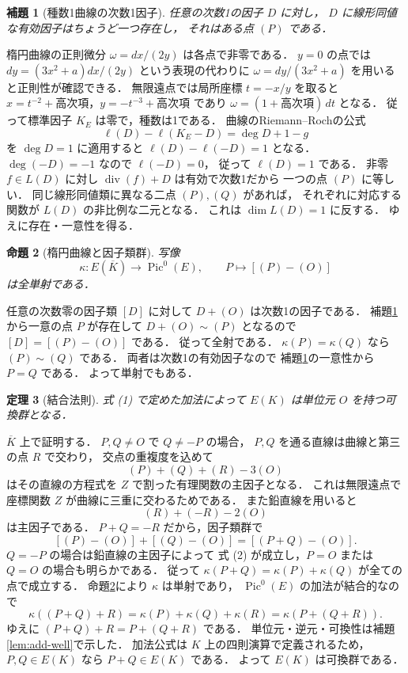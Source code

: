 \documentclass[a5paper,10pt,onecolumn]{jsarticle}
\makeatletter
\theoremstyle{mathnotetheorem}
\newtheorem{theorem}{定理}[section]
\newtheorem{lemma}[theorem]{補題}
\newtheorem{proposition}[theorem]{命題}
\renewcommand{\proofname}{証明}
\renewenvironment{proof}[1][\proofname]{%
  \par\pushQED{\qed}\normalfont\topsep4\p@\@plus2\p@\relax
  \trivlist\item[\hskip\labelsep\bfseries #1]\ignorespaces
}{\popQED\endtrivlist\@endpefalse}
\makeatother
\begin{document}
\begin{lemma}[種数1曲線の次数1因子]\label{lem:rr}
任意の次数1の因子 $D$ に対し，
$D$ に線形同値な有効因子はちょうど一つ存在し，
それはある点 $(P)$ である．
\end{lemma}
\begin{proof}
楕円曲線の正則微分 $\omega=dx/(2y)$ は各点で非零である．
$y=0$ の点では $dy=(3x^2+a)dx/(2y)$ という表現の代わりに
$\omega=dy/(3x^2+a)$ を用いると正則性が確認できる．
無限遠点では局所座標 $t=-x/y$ を取ると
$x=t^{-2}+\text{高次項}$，$y=-t^{-3}+\text{高次項}$ であり
$\omega=(1+\text{高次項})\,dt$ となる．
従って標準因子 $K_E$ は零で，種数は1である．
曲線のRiemann--Rochの公式
\[
 \ell(D)-\ell(K_E-D)=\deg D+1-g
\]
を $\deg D=1$ に適用すると
$\ell(D)-\ell(-D)=1$ となる．
$\deg(-D)=-1$ なので $\ell(-D)=0$，
従って $\ell(D)=1$ である．
非零 $f\in L(D)$ に対し
$\operatorname{div}(f)+D$ は有効で次数1だから
一つの点 $(P)$ に等しい．
同じ線形同値類に異なる二点 $(P),(Q)$ があれば，
それぞれに対応する関数が $L(D)$ の非比例な二元となる．
これは $\dim L(D)=1$ に反する．
ゆえに存在・一意性を得る．
\end{proof}

\begin{proposition}[楕円曲線と因子類群]\label{prop:pic0}
写像
\[
 \kappa:E(\overline K)\longrightarrow\operatorname{Pic}^0(E),
 \qquad P\longmapsto[(P)-(O)]
\]
は全単射である．
\end{proposition}
\begin{proof}
任意の次数零の因子類 $[D]$ に対して
$D+(O)$ は次数1の因子である．
補題\ref{lem:rr}から一意の点 $P$ が存在して
$D+(O)\sim(P)$ となるので
$[D]=[(P)-(O)]$ である．
従って全射である．
$\kappa(P)=\kappa(Q)$ なら
$(P)\sim(Q)$ である．
両者は次数1の有効因子なので
補題\ref{lem:rr}の一意性から $P=Q$ である．
よって単射でもある．
\end{proof}

\begin{theorem}[結合法則]\label{thm:group}
式 (1) で定めた加法によって
$E(K)$ は単位元 $O$ を持つ可換群となる．
\end{theorem}
\begin{proof}
$\overline K$ 上で証明する．
$P,Q\ne O$ で $Q\ne-P$ の場合，
$P,Q$ を通る直線は曲線と第三の点 $R$ で交わり，
交点の重複度を込めて
\[
 (P)+(Q)+(R)-3(O)
\]
はその直線の方程式を $Z$ で割った有理関数の主因子となる．
これは無限遠点で座標関数 $Z$ が曲線に三重に交わるためである．
また鉛直線を用いると
\[
 (R)+(-R)-2(O)
\]
は主因子である．
$P+Q=-R$ だから，因子類群で
\[
 [(P)-(O)]+[(Q)-(O)]
 =[(P+Q)-(O)].
 \tag{2}
\]
$Q=-P$ の場合は鉛直線の主因子によって
式 (2) が成立し，$P=O$ または $Q=O$ の場合も明らかである．
従って $\kappa(P+Q)=\kappa(P)+\kappa(Q)$ が全ての点で成立する．
命題\ref{prop:pic0}により $\kappa$ は単射であり，
$\operatorname{Pic}^0(E)$ の加法が結合的なので
\[
 \kappa((P+Q)+R)=\kappa(P)+\kappa(Q)+\kappa(R)
 =\kappa(P+(Q+R)).
\]
ゆえに $(P+Q)+R=P+(Q+R)$ である．
単位元・逆元・可換性は補題\ref{lem:add-well}で示した．
加法公式は $K$ 上の四則演算で定義されるため，
$P,Q\in E(K)$ なら $P+Q\in E(K)$ である．
よって $E(K)$ は可換群である．
\end{proof}
\end{document}
